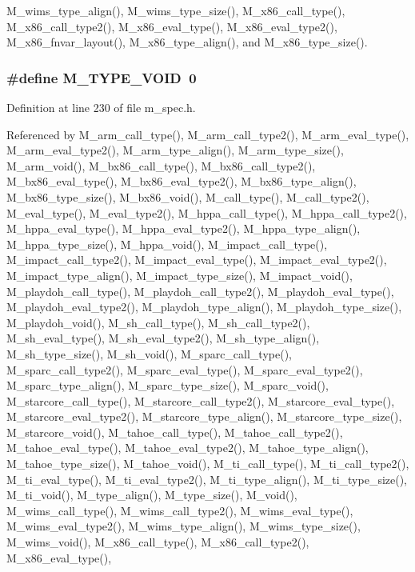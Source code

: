 M\_\-wims\_\-type\_\-align(), M\_\-wims\_\-type\_\-size(), M\_\-x86\_\-call\_\-type(), M\_\-x86\_\-call\_\-type2(), M\_\-x86\_\-eval\_\-type(), M\_\-x86\_\-eval\_\-type2(), M\_\-x86\_\-fnvar\_\-layout(), M\_\-x86\_\-type\_\-align(), and M\_\-x86\_\-type\_\-size().
\subsubsection{\setlength{\rightskip}{0pt plus 5cm}\#define M\_\-TYPE\_\-VOID~0}\label{m__spec_8h_50248eb623319a4ee36056330eefaf9a}




Definition at line 230 of file m\_\-spec.h.

Referenced by M\_\-arm\_\-call\_\-type(), M\_\-arm\_\-call\_\-type2(), M\_\-arm\_\-eval\_\-type(), M\_\-arm\_\-eval\_\-type2(), M\_\-arm\_\-type\_\-align(), M\_\-arm\_\-type\_\-size(), M\_\-arm\_\-void(), M\_\-bx86\_\-call\_\-type(), M\_\-bx86\_\-call\_\-type2(), M\_\-bx86\_\-eval\_\-type(), M\_\-bx86\_\-eval\_\-type2(), M\_\-bx86\_\-type\_\-align(), M\_\-bx86\_\-type\_\-size(), M\_\-bx86\_\-void(), M\_\-call\_\-type(), M\_\-call\_\-type2(), M\_\-eval\_\-type(), M\_\-eval\_\-type2(), M\_\-hppa\_\-call\_\-type(), M\_\-hppa\_\-call\_\-type2(), M\_\-hppa\_\-eval\_\-type(), M\_\-hppa\_\-eval\_\-type2(), M\_\-hppa\_\-type\_\-align(), M\_\-hppa\_\-type\_\-size(), M\_\-hppa\_\-void(), M\_\-impact\_\-call\_\-type(), M\_\-impact\_\-call\_\-type2(), M\_\-impact\_\-eval\_\-type(), M\_\-impact\_\-eval\_\-type2(), M\_\-impact\_\-type\_\-align(), M\_\-impact\_\-type\_\-size(), M\_\-impact\_\-void(), M\_\-playdoh\_\-call\_\-type(), M\_\-playdoh\_\-call\_\-type2(), M\_\-playdoh\_\-eval\_\-type(), M\_\-playdoh\_\-eval\_\-type2(), M\_\-playdoh\_\-type\_\-align(), M\_\-playdoh\_\-type\_\-size(), M\_\-playdoh\_\-void(), M\_\-sh\_\-call\_\-type(), M\_\-sh\_\-call\_\-type2(), M\_\-sh\_\-eval\_\-type(), M\_\-sh\_\-eval\_\-type2(), M\_\-sh\_\-type\_\-align(), M\_\-sh\_\-type\_\-size(), M\_\-sh\_\-void(), M\_\-sparc\_\-call\_\-type(), M\_\-sparc\_\-call\_\-type2(), M\_\-sparc\_\-eval\_\-type(), M\_\-sparc\_\-eval\_\-type2(), M\_\-sparc\_\-type\_\-align(), M\_\-sparc\_\-type\_\-size(), M\_\-sparc\_\-void(), M\_\-starcore\_\-call\_\-type(), M\_\-starcore\_\-call\_\-type2(), M\_\-starcore\_\-eval\_\-type(), M\_\-starcore\_\-eval\_\-type2(), M\_\-starcore\_\-type\_\-align(), M\_\-starcore\_\-type\_\-size(), M\_\-starcore\_\-void(), M\_\-tahoe\_\-call\_\-type(), M\_\-tahoe\_\-call\_\-type2(), M\_\-tahoe\_\-eval\_\-type(), M\_\-tahoe\_\-eval\_\-type2(), M\_\-tahoe\_\-type\_\-align(), M\_\-tahoe\_\-type\_\-size(), M\_\-tahoe\_\-void(), M\_\-ti\_\-call\_\-type(), M\_\-ti\_\-call\_\-type2(), M\_\-ti\_\-eval\_\-type(), M\_\-ti\_\-eval\_\-type2(), M\_\-ti\_\-type\_\-align(), M\_\-ti\_\-type\_\-size(), M\_\-ti\_\-void(), M\_\-type\_\-align(), M\_\-type\_\-size(), M\_\-void(), M\_\-wims\_\-call\_\-type(), M\_\-wims\_\-call\_\-type2(), M\_\-wims\_\-eval\_\-type(), M\_\-wims\_\-eval\_\-type2(), M\_\-wims\_\-type\_\-align(), M\_\-wims\_\-type\_\-size(), M\_\-wims\_\-void(), M\_\-x86\_\-call\_\-type(), M\_\-x86\_\-call\_\-type2(), M\_\-x86\_\-eval\_\-type(), 